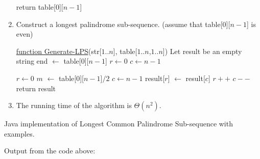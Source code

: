 \documentclass[10pt]{article}
\newenvironment{problem}[2][Problem]{\begin{trivlist}
		\item[\hskip \labelsep {\bfseries #1}\hskip \labelsep {\bfseries #2.}]}{\end{trivlist}}
\begin{document}
\begin{enumerate}[label=(\alph*)]
\begin{algorithm}
		return table[$0$][$n-1$]\;
	\end{algorithm}
	
	\newpage
\item Construct a longest palindrome sub-sequence. (assume that table[$0$][$n-1$] is even)\newline
	\begin{algorithm}
		\underline{function Generate-LPS}(str[$1..n$], table[$1..n$,$1..n$])\;
		Let result be an empty string\;		
		end $\gets$ table[$0$][$n-1$]\;	
		$r \gets 0$\;
		$c \gets n-1$\;	
		
		
			$r\gets0$\;
			$ m$ $\gets$ table[$0$][$n-1$]$/2$\;
			$c \gets n - 1$\;
			{
				result[$r$] $\gets$ result[$c$]\;
				$r++$\;
				$c--$\;
			}
		return result\;
		
	\end{algorithm}
	
	
\item The running time of the algorithm is $\Theta(n^2)$.
\end{enumerate}

\newpage 
\begin{problem}{2}
Java implementation of Longest Common Palindrome Sub-sequence with examples. 
\end{problem}


Output from the code above: 

\end{document}
